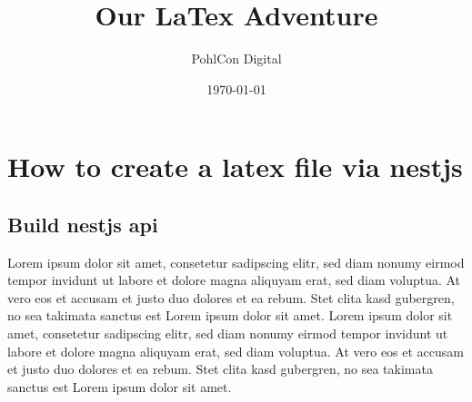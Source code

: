 \documentclass{report}
\title{Our LaTex Adventure}
\author{PohlCon Digital}
\date{\today}
\begin{document}
\maketitle

\chapter{How to create a latex file via nestjs}

\section{Build nestjs api}

Lorem ipsum dolor sit amet, consetetur sadipscing elitr, sed diam nonumy eirmod tempor invidunt ut labore et dolore magna aliquyam erat, sed diam voluptua. At vero eos et accusam et justo duo dolores et ea rebum. Stet clita kasd gubergren, no sea takimata sanctus est Lorem ipsum dolor sit amet. Lorem ipsum dolor sit amet, consetetur sadipscing elitr, sed diam nonumy eirmod tempor invidunt ut labore et dolore magna aliquyam erat, sed diam voluptua. At vero eos et accusam et justo duo dolores et ea rebum. Stet clita kasd gubergren, no sea takimata sanctus est Lorem ipsum dolor sit amet.
\end{document}
